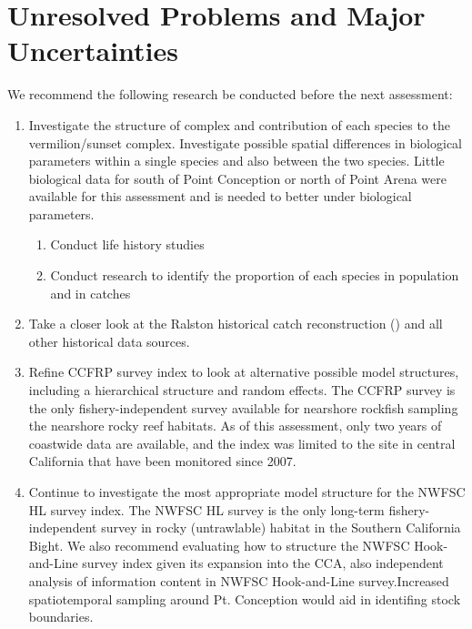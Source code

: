 \documentclass[11pt,
  english,
  a4paper,
]{article}
\begin{document}

\hypertarget{unresolved-problems-and-major-uncertainties-2}{%
\section{Unresolved Problems and Major Uncertainties}\label{unresolved-problems-and-major-uncertainties-2}}

\leavevmode\tagmcend\tagstructend

We recommend the following research be conducted before the next assessment:

\begin{enumerate}

\item Investigate the structure of complex and contribution of each species to the 
vermilion/sunset complex. Investigate possible spatial differences in biological parameters within 
a single species and also between the two species.  Little biological data for south of 
Point Conception or north of Point Arena were available for this assessment and is needed 
to better under biological parameters. 
    \begin{enumerate}
     \item Conduct life history studies
     \item Conduct research to identify the proportion of each species in population and in catches
    \end{enumerate}


\item Take a closer look at the Ralston historical catch reconstruction (\cite{Ralston2010}) and 
all other historical data sources.

\item Refine CCFRP survey index to look at alternative possible model structures, including 
a hierarchical structure and random effects. The CCFRP survey is the only 
fishery-independent survey available for nearshore rockfish sampling the nearshore rocky 
reef habitats. As of this assessment, only two years of coastwide data are available, 
and the index was limited to the site in central California that have been monitored 
since 2007.

\item Continue to investigate the most appropriate model structure for the NWFSC HL survey index.
The NWFSC HL survey is the only long-term fishery-independent survey in rocky (untrawlable) habitat 
in the Southern California Bight. We also recommend evaluating how to structure the NWFSC Hook-and-Line survey index given its expansion into the CCA, also independent analysis of information content in NWFSC Hook-and-Line survey.Increased spatiotemporal sampling around Pt. Conception would aid in identifing stock boundaries.


\end{enumerate}
\end{document}
